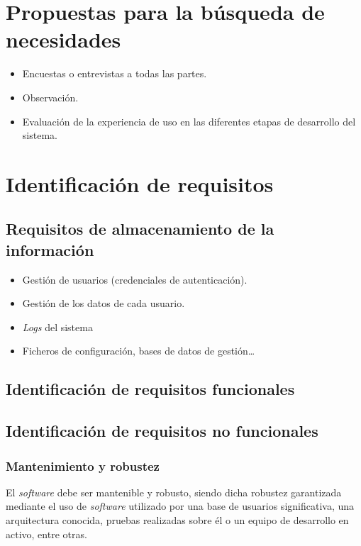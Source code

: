 \section{Propuestas para la búsqueda de necesidades}

\begin{itemize}
  \item Encuestas o entrevistas a todas las partes.
  \item Observación.
  \item Evaluación de la experiencia de uso en las diferentes etapas de desarrollo del sistema.
\end{itemize}

\section{Identificación de requisitos}

\subsection{Requisitos de almacenamiento de la información}

\begin{itemize}
  \item Gestión de usuarios (credenciales de autenticación).
  \item Gestión de los datos de cada usuario.
  \item \textit{Logs} del sistema
  \item Ficheros de configuración, bases de datos de gestión\dots
\end{itemize}

\subsection{Identificación de requisitos funcionales}


\subsection{Identificación de requisitos no funcionales}

\subsubsection{Mantenimiento y robustez}

El \textit{software} debe ser mantenible y robusto, siendo dicha robustez garantizada mediante el uso de \textit{software} utilizado por una base de usuarios significativa, una arquitectura conocida, pruebas realizadas sobre él o un equipo de desarrollo en activo, entre otras.

